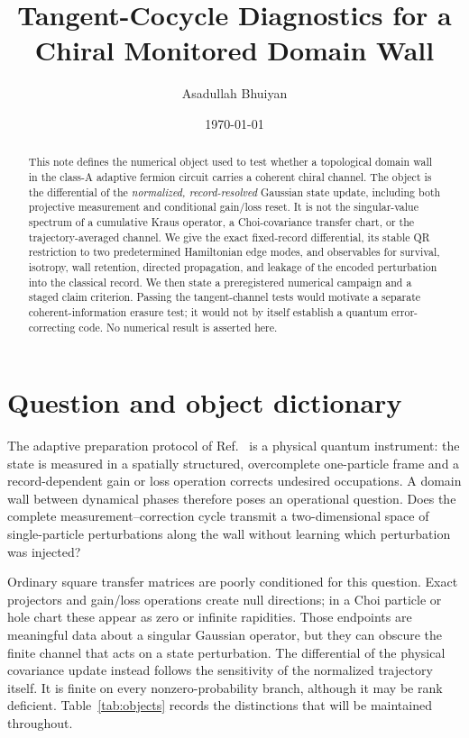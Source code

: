\documentclass[aps,prb,onecolumn,nofootinbib,superscriptaddress]{revtex4-2}
\begin{document}
\title{Tangent-Cocycle Diagnostics for a Chiral Monitored Domain Wall}
\author{Asadullah Bhuiyan}
\date{\today}

\begin{abstract}
This note defines the numerical object used to test whether a topological
domain wall in the class-A adaptive fermion circuit carries a coherent chiral
channel.  The object is the differential of the \emph{normalized,
record-resolved} Gaussian state update, including both projective measurement
and conditional gain/loss reset.  It is not the singular-value spectrum of a
cumulative Kraus operator, a Choi-covariance transfer chart, or the
trajectory-averaged channel.  We give the exact fixed-record differential,
its stable QR restriction to two predetermined Hamiltonian edge modes, and
observables for survival, isotropy, wall retention, directed propagation, and
leakage of the encoded perturbation into the classical record.  We then state
a preregistered numerical campaign and a staged claim criterion.  Passing the
tangent-channel tests would motivate a separate coherent-information erasure
test; it would not by itself establish a quantum error-correcting code.  No
numerical result is asserted here.
\end{abstract}

\maketitle
\setcounter{tocdepth}{2}
\tableofcontents

\section{Question and object dictionary}
\label{sec:question}

The adaptive preparation protocol of Ref.~\cite{BhuiyanPanJian2026} is a
physical quantum instrument: the state is measured in a spatially structured,
overcomplete one-particle frame and a record-dependent gain or loss operation
corrects undesired occupations.  A domain wall between dynamical phases
therefore poses an operational question.  Does the complete
measurement--correction cycle transmit a two-dimensional space of
single-particle perturbations along the wall without learning which
perturbation was injected?

Ordinary square transfer matrices are poorly conditioned for this question.
Exact projectors and gain/loss operations create null directions; in a Choi
particle or hole chart these appear as zero or infinite rapidities.  Those
endpoints are meaningful data about a singular Gaussian operator, but they can
obscure the finite channel that acts on a state perturbation.  The differential
of the physical covariance update instead follows the sensitivity of the
normalized trajectory itself.  It is finite on every nonzero-probability
branch, although it may be rank deficient.  Table~\ref{tab:objects} records the
distinctions that will be maintained throughout.
\end{document}
